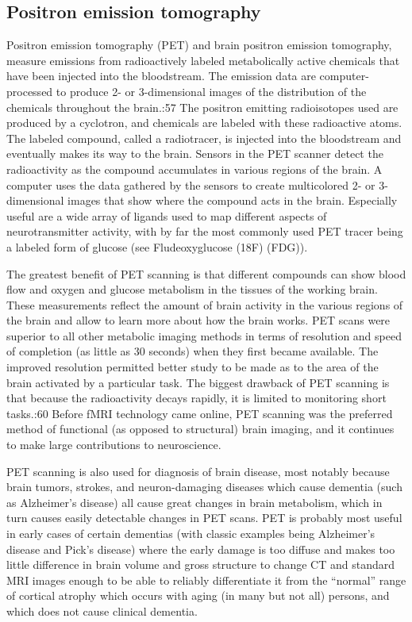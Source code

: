 \hypertarget{positron-emission-tomography}{%
\subsection{Positron emission tomography}\label{positron-emission-tomography}}

Positron emission tomography (PET) and brain positron emission tomography, measure emissions from radioactively labeled metabolically active chemicals that have been injected into the bloodstream. The emission data are computer-processed to produce 2- or 3-dimensional images of the distribution of the chemicals throughout the brain.:57 The positron emitting radioisotopes used are produced by a cyclotron, and chemicals are labeled with these radioactive atoms. The labeled compound, called a radiotracer, is injected into the bloodstream and eventually makes its way to the brain. Sensors in the PET scanner detect the radioactivity as the compound accumulates in various regions of the brain. A computer uses the data gathered by the sensors to create multicolored 2- or 3-dimensional images that show where the compound acts in the brain. Especially useful are a wide array of ligands used to map different aspects of neurotransmitter activity, with by far the most commonly used PET tracer being a labeled form of glucose (see Fludeoxyglucose (18F) (FDG)).

The greatest benefit of PET scanning is that different compounds can show blood flow and oxygen and glucose metabolism in the tissues of the working brain. These measurements reflect the amount of brain activity in the various regions of the brain and allow to learn more about how the brain works. PET scans were superior to all other metabolic imaging methods in terms of resolution and speed of completion (as little as 30 seconds) when they first became available. The improved resolution permitted better study to be made as to the area of the brain activated by a particular task. The biggest drawback of PET scanning is that because the radioactivity decays rapidly, it is limited to monitoring short tasks.:60 Before fMRI technology came online, PET scanning was the preferred method of functional (as opposed to structural) brain imaging, and it continues to make large contributions to neuroscience.

PET scanning is also used for diagnosis of brain disease, most notably because brain tumors, strokes, and neuron-damaging diseases which cause dementia (such as Alzheimer's disease) all cause great changes in brain metabolism, which in turn causes easily detectable changes in PET scans. PET is probably most useful in early cases of certain dementias (with classic examples being Alzheimer's disease and Pick's disease) where the early damage is too diffuse and makes too little difference in brain volume and gross structure to change CT and standard MRI images enough to be able to reliably differentiate it from the ``normal'' range of cortical atrophy which occurs with aging (in many but not all) persons, and which does not cause clinical dementia.

